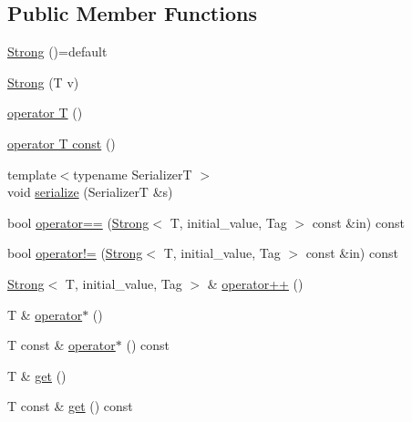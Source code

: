 \subsection*{Public Member Functions}
\begin{DoxyCompactItemize}
\item 
\hyperlink{structvt_1_1collective_1_1reduce_1_1detail_1_1_strong_af1121c0e63f347e779f1cad333792056}{Strong} ()=default
\item 
\hyperlink{structvt_1_1collective_1_1reduce_1_1detail_1_1_strong_ad7d4a59581e1961b643c853c8e7c58c3}{Strong} (T v)
\item 
\hyperlink{structvt_1_1collective_1_1reduce_1_1detail_1_1_strong_a6390ad9dc68266d649493d5bcf83dc42}{operator T} ()
\item 
\hyperlink{structvt_1_1collective_1_1reduce_1_1detail_1_1_strong_a641850befb357381a38c66486a27f14f}{operator T const} ()
\item 
{\footnotesize template$<$typename SerializerT $>$ }\\void \hyperlink{structvt_1_1collective_1_1reduce_1_1detail_1_1_strong_a6abf31948f9dbd77f4caeb265fd68586}{serialize} (SerializerT \&s)
\item 
bool \hyperlink{structvt_1_1collective_1_1reduce_1_1detail_1_1_strong_ac8773530a7b4b1a3b5e54eb6f945c582}{operator==} (\hyperlink{structvt_1_1collective_1_1reduce_1_1detail_1_1_strong}{Strong}$<$ T, initial\+\_\+value, Tag $>$ const \&in) const
\item 
bool \hyperlink{structvt_1_1collective_1_1reduce_1_1detail_1_1_strong_a82bf11914af5ac09c78eb102fb04607a}{operator!=} (\hyperlink{structvt_1_1collective_1_1reduce_1_1detail_1_1_strong}{Strong}$<$ T, initial\+\_\+value, Tag $>$ const \&in) const
\item 
\hyperlink{structvt_1_1collective_1_1reduce_1_1detail_1_1_strong}{Strong}$<$ T, initial\+\_\+value, Tag $>$ \& \hyperlink{structvt_1_1collective_1_1reduce_1_1detail_1_1_strong_a403ac1145637bfab0550181b5f7bdd5f}{operator++} ()
\item 
T \& \hyperlink{structvt_1_1collective_1_1reduce_1_1detail_1_1_strong_ae4f668ef8de598177396f4dc575fce3c}{operator$\ast$} ()
\item 
T const  \& \hyperlink{structvt_1_1collective_1_1reduce_1_1detail_1_1_strong_abddd678b81243106268873116676f135}{operator$\ast$} () const
\item 
T \& \hyperlink{structvt_1_1collective_1_1reduce_1_1detail_1_1_strong_a410692a65741df1c5e3a5498f22717c6}{get} ()
\item 
T const  \& \hyperlink{structvt_1_1collective_1_1reduce_1_1detail_1_1_strong_a329a5157d759c1c413380b495d23c79f}{get} () const
\end{DoxyCompactItemize}
